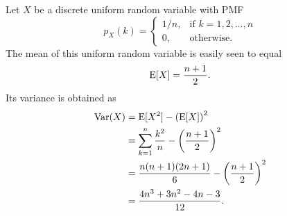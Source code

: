 \begin{example}
Let $X$ be a discrete uniform random variable with PMF
\begin{equation*}
p_X (k) = \left\{ \begin{array}{ll}
1/n, & \text{if }k = 1, 2, \ldots, n \\
0, & \text{otherwise} .
\end{array} \right.
\end{equation*}
The mean of this uniform random variable is easily seen to equal
\begin{equation*}
\mathrm{E} [X] = \frac{n+1}{2} .
\end{equation*}
Its variance is obtained  as
\begin{equation*}
\begin{split}
\mathrm{Var} (X) &= \mathrm{E} [X^2] - \left( \mathrm{E} [X] \right)^2 \\
&= \sum_{k=1}^n \frac{k^2}{n} - \left( \frac{n+1}{2} \right)^2 \\
&= \frac{n(n+1)(2n+1)}{6} - \left( \frac{n+1}{2} \right)^2 \\
&= \frac{4 n^3 + 3 n^2 - 4 n -3}{12} .
\end{split}
\end{equation*}
\end{example}

